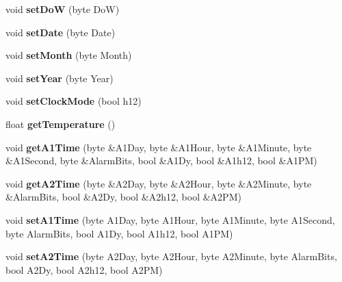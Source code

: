 \begin{DoxyCompactItemize}
\item 
\mbox{\label{class_d_s3231_a67912ef0f00a6bdabca0be96759eae87}} 
void {\bfseries set\+DoW} (byte DoW)
\item 
\mbox{\label{class_d_s3231_aa1d137b28dbf08532199c63d9e66f4ab}} 
void {\bfseries set\+Date} (byte Date)
\item 
\mbox{\label{class_d_s3231_a1bc0c59e750293f4a5e20094d8bb2aa4}} 
void {\bfseries set\+Month} (byte Month)
\item 
\mbox{\label{class_d_s3231_abb71f6d09c78f60a70241576164ef38f}} 
void {\bfseries set\+Year} (byte Year)
\item 
\mbox{\label{class_d_s3231_af312becef0c88e35c0a713da155d3c80}} 
void {\bfseries set\+Clock\+Mode} (bool h12)
\item 
\mbox{\label{class_d_s3231_abe7226b298fe8ad4fb0e7b49a840db91}} 
float {\bfseries get\+Temperature} ()
\item 
\mbox{\label{class_d_s3231_a04a1cc7bfd26c82a34c085d72145ff67}} 
void {\bfseries get\+A1\+Time} (byte \&A1\+Day, byte \&A1\+Hour, byte \&A1\+Minute, byte \&A1\+Second, byte \&Alarm\+Bits, bool \&A1\+Dy, bool \&A1h12, bool \&A1\+PM)
\item 
\mbox{\label{class_d_s3231_aea9647fa69c915197df18d4c9d811e4c}} 
void {\bfseries get\+A2\+Time} (byte \&A2\+Day, byte \&A2\+Hour, byte \&A2\+Minute, byte \&Alarm\+Bits, bool \&A2\+Dy, bool \&A2h12, bool \&A2\+PM)
\item 
\mbox{\label{class_d_s3231_a512c3ad6135e5c1e694857ff47d50ff3}} 
void {\bfseries set\+A1\+Time} (byte A1\+Day, byte A1\+Hour, byte A1\+Minute, byte A1\+Second, byte Alarm\+Bits, bool A1\+Dy, bool A1h12, bool A1\+PM)
\item 
\mbox{\label{class_d_s3231_ab2fe335e7a413f64eb7df80841abe8f3}} 
void {\bfseries set\+A2\+Time} (byte A2\+Day, byte A2\+Hour, byte A2\+Minute, byte Alarm\+Bits, bool A2\+Dy, bool A2h12, bool A2\+PM)
\item 

\end{DoxyCompactItemize}

